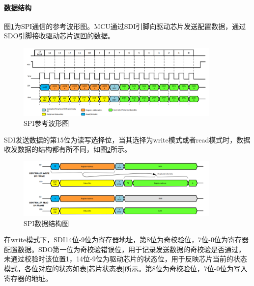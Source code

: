 \paragraph{数据结构}


图\ref{SPI参考波形图}为SPI通信的参考波形图。MCU通过SDI引脚向驱动芯片发送配置数据，通过SDO引脚接收驱动芯片返回的数据。
\begin{figure}[!h]
	\centering
	\includegraphics[width=10cm]{figure/SPI Frame.png}
	\caption{SPI参考波形图}
	\label{SPI参考波形图}
\end{figure}\par
SDI发送数据的第15位为读写选择位，当其选择为write模式或者read模式时，数据收发数据的结构都有所不同，如图\ref{SPI数据结构图}所示。
\begin{figure}[!h]
	\centering
	\includegraphics[width=10cm]{figure/SPI Transfer Sequence.png}
	\caption{SPI数据结构图}
	\label{SPI数据结构图}
\end{figure}\par


在write模式下，SDI14位-9位为寄存器地址，第8位为奇校验位，7位-0位为寄存器配置数据。SDO第一位为奇校验错误位，用于记录发送数据的奇校验是否通过，未通过校验时该位置1，14位-9位为驱动芯片的状态位，用于反映芯片当前的状态模式，各位对应的状态如表\ref{芯片状态表}所示。第8位为奇校验位，7位-0位为写入寄存器的地址。\par

